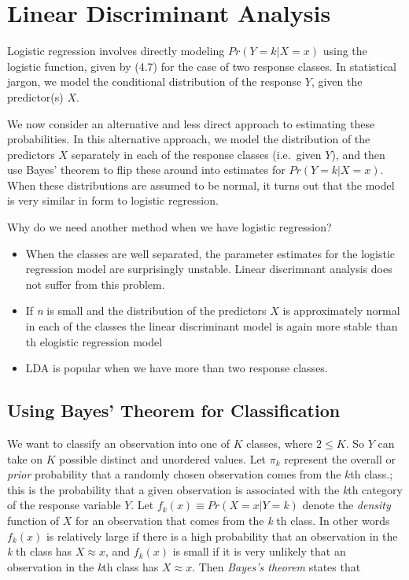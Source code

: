 \documentclass[
  letterpaper,
  DIV=11,
  numbers=noendperiod]{scrreprt}
\begin{document}
{\hypertarget{linear-discriminant-analysis}{%
\section{Linear Discriminant
Analysis}\label{linear-discriminant-analysis}}

Logistic regression involves directly modeling \(Pr(Y = k | X = x)\)
using the logistic function, given by (4.7) for the case of two response
classes. In statistical jargon, we model the conditional distribution of
the response \(Y\), given the predictor(s) \(X\).

We now consider an alternative and less direct approach to estimating
these probabilities. In this alternative approach, we model the
distribution of the predictors \(X\) separately in each of the response
classes (i.e.~given \(Y\)), and then use Bayes' theorem to flip these
around into estimates for \(Pr(Y = k | X = x)\). When these
distributions are assumed to be normal, it turns out that the model is
very similar in form to logistic regression.

Why do we need another method when we have logistic regression?

\begin{itemize}
\item
  When the classes are well separated, the parameter estimates for the
  logistic regression model are surprisingly unstable. Linear
  discrimnant analysis does not suffer from this problem.
\item
  If \emph{n} is small and the distribution of the predictors \(X\) is
  approximately normal in each of the classes the linear discriminant
  model is again more stable than th elogistic regression model
\item
  LDA is popular when we have more than two response classes.
\end{itemize}

\hypertarget{using-bayes-theorem-for-classification}{%
\subsection{Using Bayes' Theorem for
Classification}\label{using-bayes-theorem-for-classification}}

We want to classify an observation into one of \(K\) classes, where
\(2 \leq K\). So \(Y\) can take on \(K\) possible distinct and unordered
values. Let \(\pi_k\) represent the overall or \emph{prior} probability
that a randomly chosen observation comes from the \(k\)th class.; this
is the probability that a given observation is associated with the
\emph{k}th category of the response variable \(Y\). Let
\(f_k(x) \equiv Pr(X = x | Y = k)\) denote the \emph{density} function
of \(X\) for an observation that comes from the \emph{k} th class. In
other words \(f_k(x)\) is relatively large if there is a high
probability that an observation in the \emph{k} th class has
\(X \approx x\), and \(f_k(x)\) is small if it is very unlikely that an
observation in the \emph{k}th class has \(X \approx x\). Then
\emph{Bayes's theorem} states that

}
\end{document}
